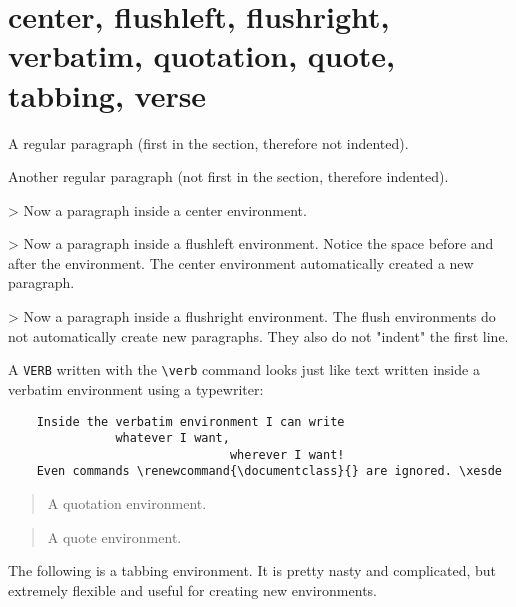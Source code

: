 \documentclass[environments-demo.tex]{subfiles}
\begin{document}
\section{center, flushleft, flushright, verbatim, quotation, quote, tabbing, verse}

A regular paragraph
(first in the section, therefore not indented).
\blindtext

Another regular paragraph
(not first in the section, therefore indented).
\blindtext

\begin{center}
> Now a paragraph inside a center environment.
\blindtext

\blindtext
\end{center}
\begin{flushleft}
> Now a paragraph inside a flushleft environment.
Notice the space before and after the environment.
The center environment automatically created a new paragraph.
\blindtext
\end{flushleft}

\begin{flushright}
> Now a paragraph inside a flushright environment.
The flush environments do not automatically create new paragraphs. They also do not "indent" the first line.
\blindtext
\end{flushright}

A \verb+VERB+ written with the \verb+\verb+ command
looks just like text written inside a verbatim environment
using a typewriter:

\begin{verbatim}
    Inside the verbatim environment I can write
               whatever I want,
                               wherever I want!
    Even commands \renewcommand{\documentclass}{} are ignored. \xesde
\end{verbatim}

\begin{quotation}
A quotation environment.
\blindtext
\end{quotation}

\begin{quote}
A quote environment.
\blindtext
\end{quote}

The following is a tabbing environment. It is pretty nasty and complicated,
but extremely flexible and useful for creating new environments.
\end{document}
